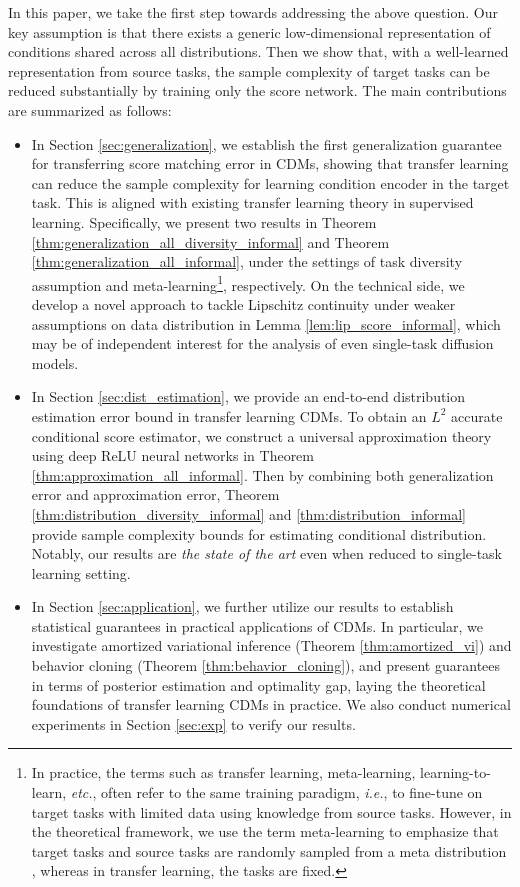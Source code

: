 \documentclass[11pt]{article}
\numberwithin{equation}{section}
\begin{document}
In this paper, we take the first step towards addressing the above question.
Our key assumption is that there exists a generic low-dimensional representation of conditions shared across all distributions.
Then we show that, with a well-learned representation from source tasks, the sample complexity of target tasks can be reduced substantially by training only the score network.  
The main contributions are summarized as follows:
\begin{itemize}
    \item In Section \ref{sec:generalization}, we establish the first generalization guarantee for transferring score matching error in CDMs, showing that transfer learning can reduce the sample complexity for learning condition encoder in the target task.
    This is aligned with existing transfer learning theory in supervised learning.
    Specifically, we present two results in Theorem \ref{thm:generalization_all_diversity_informal} and Theorem \ref{thm:generalization_all_informal}, under the settings of task diversity assumption and meta-learning\footnote{In practice, the terms such as transfer learning, meta-learning, learning-to-learn, \textit{etc.}, often refer to the same training paradigm, \textit{i.e.}, to fine-tune on target tasks with limited data using knowledge from source tasks. However, in the theoretical framework, we use the term meta-learning to emphasize that target tasks and source tasks are randomly sampled from a meta distribution \citep{baxter2000model}, whereas in transfer learning, the tasks are fixed.}, respectively.
    On the technical side, we develop a novel approach to tackle Lipschitz continuity under weaker assumptions on data distribution in Lemma \ref{lem:lip_score_informal}, which may be of independent interest for the analysis of even single-task diffusion models.
    \item In Section \ref{sec:dist_estimation}, we provide an end-to-end distribution estimation error bound in transfer learning CDMs.
    To obtain an $L^2$ accurate conditional score estimator, we construct a universal approximation theory using deep ReLU neural networks in Theorem \ref{thm:approximation_all_informal}. 
    Then by combining both generalization error and approximation error, Theorem \ref{thm:distribution_diversity_informal} and \ref{thm:distribution_informal} provide sample complexity bounds for estimating conditional distribution. 
    Notably, our results are \textit{the state of the art} even when reduced to single-task learning setting. 
    \item In Section \ref{sec:application}, we further utilize our results to establish statistical guarantees in practical applications of CDMs.
    In particular, we investigate amortized variational inference (Theorem \ref{thm:amortized_vi}) and behavior cloning (Theorem \ref{thm:behavior_cloning}), and present guarantees in terms of posterior estimation and optimality gap, laying the theoretical foundations of transfer learning CDMs in practice. We also conduct numerical experiments in Section \ref{sec:exp} to verify our results.
\end{itemize}
\end{document}
